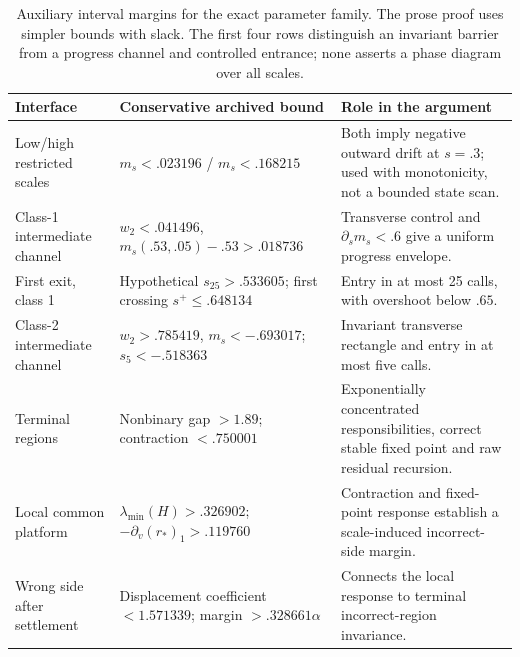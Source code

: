\begin{table}[t]
\centering\small
\begin{tabular}{p{}p{}p{}}
\toprule
Interface & Conservative archived bound & Role in the argument\\
\midrule
Low/high restricted scales & $m_s<.023196$ / $m_s<.168215$ & Both imply negative outward drift at $s=.3$; used with monotonicity, not a bounded state scan.\\
Class-1 intermediate channel & $w_2<.041496$, $m_s(.53,.05)-.53>.018736$ & Transverse control and $\partial_sm_s<.6$ give a uniform progress envelope.\\
First exit, class 1 & Hypothetical $s_{25}>.533605$; first crossing $s^+\le.648134$ & Entry in at most 25 calls, with overshoot below $.65$.\\
Class-2 intermediate channel & $w_2>.785419$, $m_s<-.693017$; $s_5<-.518363$ & Invariant transverse rectangle and entry in at most five calls.\\
Terminal regions & Nonbinary gap $>1.89$; contraction $<.750001$ & Exponentially concentrated responsibilities, correct stable fixed point and raw residual recursion.\\
Local common platform & $\lambda_{\min}(H)>.326902$; $-\partial_v(r_*)_1>.119760$ & Contraction and fixed-point response establish a scale-induced incorrect-side margin.\\
Wrong side after settlement & Displacement coefficient $<1.571339$; margin $>.328661\alpha$ & Connects the local response to terminal incorrect-region invariance.\\
\bottomrule
\end{tabular}
\caption{Auxiliary interval margins for the exact parameter family. The prose proof uses simpler bounds with slack. The first four rows distinguish an invariant barrier from a progress channel and controlled entrance; none asserts a phase diagram over all scales.}
\label{tab:certificate}
\end{table}

